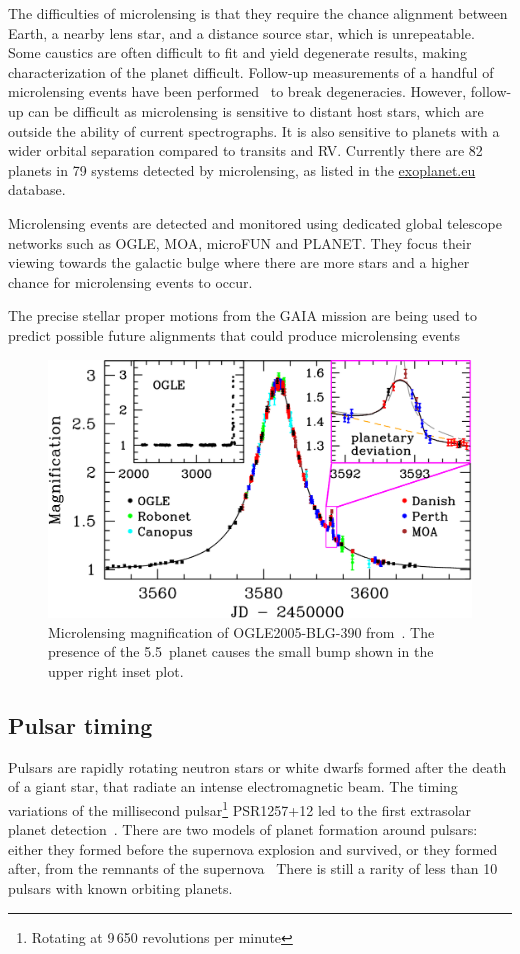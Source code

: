 The difficulties of microlensing is that they require the chance alignment between Earth, a nearby lens star, and a distance source star, which is unrepeatable.
Some caustics are often difficult to fit and yield degenerate results, making characterization of the planet difficult.
Follow-up measurements of a handful of microlensing events have been performed~\citep[e.g.][]{kubas_frozen_2012, batista_confirmation_2015, santerne_spectroscopic_2016} to break degeneracies.
However, follow-up can be difficult as microlensing is sensitive to distant host stars, which are outside the ability of current spectrographs.
It is also sensitive to planets with a wider orbital separation compared to transits and {RV}.
Currently there are 82 planets in 79 systems detected by microlensing, as listed in the \href{https:\\www.exoplanet.eu}{exoplanet.eu} database.

Microlensing events are detected and monitored using dedicated global telescope networks such as {OGLE}, {MOA}, {microFUN} and {PLANET}.
They focus their viewing towards the galactic bulge where there are more stars and a higher chance for microlensing events to occur.

The precise stellar proper motions from the GAIA mission are being used to predict possible future alignments that could produce microlensing events~\citep{kluter_prediction_2018}

\begin{figure}
    \centering
    \includegraphics[width=0.5\linewidth]{./figures/introduction/Microlensing_OGLE2005-BLG-390.pdf}
    \caption{Microlensing magnification of OGLE2005-BLG-390 from~\citep{beaulieu_discovery_2006}.
    The presence of the 5.5\,\Mjup{} planet causes the small bump shown in the upper right inset plot.}
    \label{fig:microlensing_example}
\end{figure}


\subsection{Pulsar timing}
\label{subsec:pulsar_timing}
Pulsars are rapidly rotating neutron stars or white dwarfs formed after the death of a giant star, that radiate an intense electromagnetic beam.
The timing variations of the millisecond pulsar\footnote{Rotating at 9\,650 revolutions per minute} {PSR1257+12} led to the first extrasolar planet detection~\citep{wolszczan_planetary_1992}.
There are two models of planet formation around pulsars: either they formed before the supernova explosion and survived, or they formed after, from the remnants of the supernova~\citep{starovoit_existence_2017}
There is still a rarity of less than 10 pulsars with known orbiting planets.
